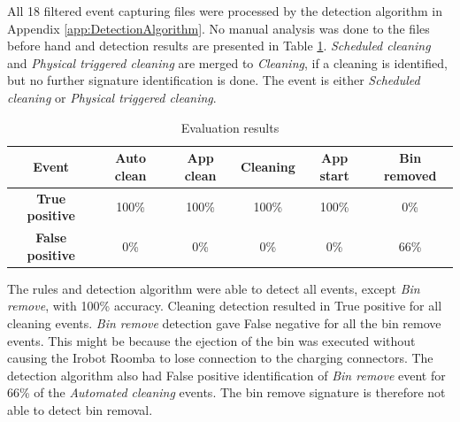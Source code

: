 All 18 filtered event capturing files were processed by the detection algorithm in Appendix \ref{app:DetectionAlgorithm}. No manual analysis was done to the files before hand and detection results are presented in Table \ref{tab:Evaluation results}. \textit{Scheduled cleaning} and \textit{Physical triggered cleaning} are merged to \textit{Cleaning}, if a cleaning is identified, but no further signature identification is done. The event is either \textit{Scheduled cleaning} or \textit{Physical triggered cleaning}. 

\begin{table}[H]
\small
\centering
\caption{Evaluation results}
\label{tab:Evaluation results}
\begin{tabular}{|c|c|c|c|c|c|}
\hline
\textbf{Event}        & Auto clean & App clean & Cleaning & App start & Bin removed \\ \hline
\textbf{True positive} & 100\% & 100\%  & 100\% & 100\%  & 0\%         \\ \hline
\textbf{False positive} & 0\%  & 0\%  & 0\% & 0\%  & 66\%         \\ \hline

\end{tabular}
\end{table}

The rules and detection algorithm were able to detect all events, except \textit{Bin remove}, with 100\% accuracy. Cleaning detection resulted in True positive for all cleaning events. \textit{Bin remove} detection gave False negative for all the bin remove events. This might be because the ejection of the bin was executed without causing the Irobot Roomba to lose connection to the charging connectors. The detection algorithm also had False positive identification of \textit{Bin remove} event for 66\% of the \textit{Automated cleaning} events. The bin remove signature is therefore not able to detect bin removal. 




